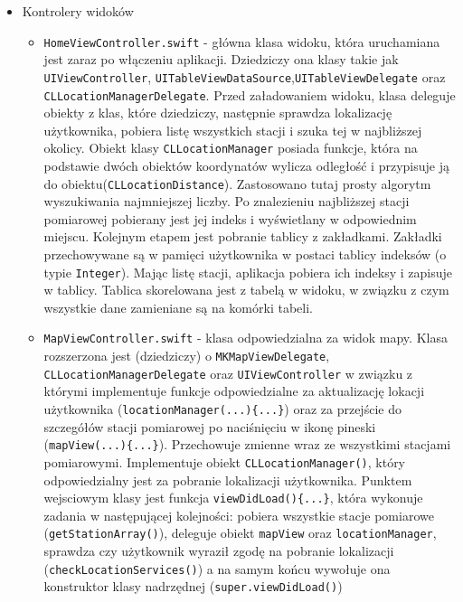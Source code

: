 \documentclass[a4paper,11pt,titlepage]{article}
\begin{document}
\begin{itemize}
 	\item Kontrolery widoków
	\begin{itemize}
		\item \verb|HomeViewController.swift| - główna klasa widoku, która uruchamiana jest zaraz po włączeniu aplikacji. Dziedziczy ona klasy takie jak \verb|UIViewController|, \verb|UITableViewDataSource|,\newline \verb|UITableViewDelegate| oraz \verb|CLLocationManagerDelegate|. Przed załadowaniem widoku, klasa deleguje obiekty z klas, które dziedziczy, następnie sprawdza lokalizację użytkownika, pobiera listę wszystkich stacji i szuka tej w najbliższej okolicy. Obiekt klasy \verb|CLLocationManager| posiada funkcje, która na podstawie dwóch obiektów koordynatów wylicza odległość i przypisuje ją do obiektu(\verb|CLLocationDistance|). Zastosowano tutaj prosty algorytm wyszukiwania najmniejszej liczby. Po znalezieniu najbliższej stacji pomiarowej pobierany jest jej indeks i wyświetlany w odpowiednim miejscu. Kolejnym etapem jest pobranie tablicy z zakładkami. Zakładki przechowywane są w pamięci użytkownika w postaci tablicy indeksów (o typie \verb|Integer|). Mając listę stacji, aplikacja pobiera ich indeksy i zapisuje w tablicy. Tablica skorelowana jest z tabelą w widoku, w związku z czym wszystkie dane zamieniane są na komórki tabeli.
		\item \verb|MapViewController.swift| - klasa odpowiedzialna za widok mapy. Klasa rozszerzona jest (dziedziczy) o \verb|MKMapViewDelegate|, \newline \verb|CLLocationManagerDelegate| oraz \verb|UIViewController| w związku z którymi implementuje funkcje odpowiedzialne za aktualizację lokacji użytkownika (\verb|locationManager(...){...}|) oraz za przejście do szczegółów stacji pomiarowej po naciśnięciu w ikonę pineski (\verb|mapView(...){...}|). Przechowuje zmienne wraz ze wszystkimi stacjami pomiarowymi. Implementuje obiekt \newline \verb|CLLocationManager()|, który odpowiedzialny jest za pobranie lokalizacji użytkownika. Punktem wejsciowym klasy jest funkcja \verb|viewDidLoad(){...}|, która wykonuje zadania w następującej kolejności: pobiera wszystkie stacje pomiarowe (\verb|getStationArray()|), deleguje obiekt \verb|mapView| oraz \verb|locationManager|, sprawdza czy użytkownik wyraził zgodę na pobranie lokalizacji \newline(\verb|checkLocationServices()|) a na samym końcu wywołuje ona konstruktor klasy nadrzędnej (\verb|super.viewDidLoad()|)

\end{itemize}
\end{itemize}
\end{document}
